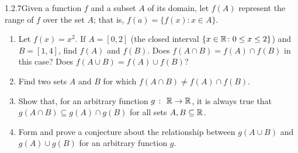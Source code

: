 \begin{exercise}
    {1.2.7}Given a function \(f\) and a subset \(A\) of its domain, let \(f(A)\)
    represent the range of \(f\) over the set \(A\); that is, \(f(a) = \{f(x) \colon x \in A\}\).
    \begin{enumerate}
        \item Let \(f(x) = x^2\). If \(A = [0,2]\) (the closed interval \(\{x \in \mathbb{R} \colon 0 \leq x \leq 2\}\)) and \(B = [1,4]\), find \(f(A)\) and \(f(B)\). Does \(f(A\cap B) = f(A) \cap f(B)\) in this case? Does \(f(A \cup B) = f(A) \cup f(B)\)?
        \item Find two sets \(A\) and \(B\) for which \(f(A\cap B) \ne f(A) \cap f(B)\).
        \item Show that, for an arbitrary function \(g \ \colon \ \mathbb{R} \rightarrow \mathbb{R}\), it is always true that \(g(A \cap B) \subseteq g(A) \cap g(B)\) for all sets \(A,B\subseteq \mathbb{R}\).
        \item Form and prove a conjecture about the relationship between \(g(A \cup B)\) and \(g(A) \cup g(B)\) for an arbitrary function \(g\).
    \end{enumerate}
\end{exercise}

